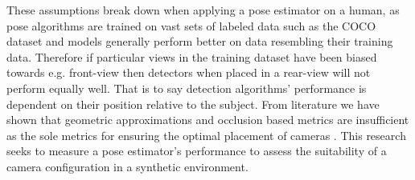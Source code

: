 These assumptions break down when applying a pose estimator on a human, as pose algorithms are trained on vast sets of labeled data such as the COCO dataset and models generally perform better on data resembling their training data. Therefore if particular views in the training dataset have been biased towards e.g. front-view then detectors when placed in a rear-view will not perform equally well. That is to say detection algorithms' performance is dependent on their position relative to the subject.
From literature we have shown that geometric approximations and occlusion based metrics are insufficient as the sole metrics for ensuring the optimal placement of cameras . This research seeks to measure a pose estimator's performance to assess the suitability of a camera configuration in a synthetic environment.

